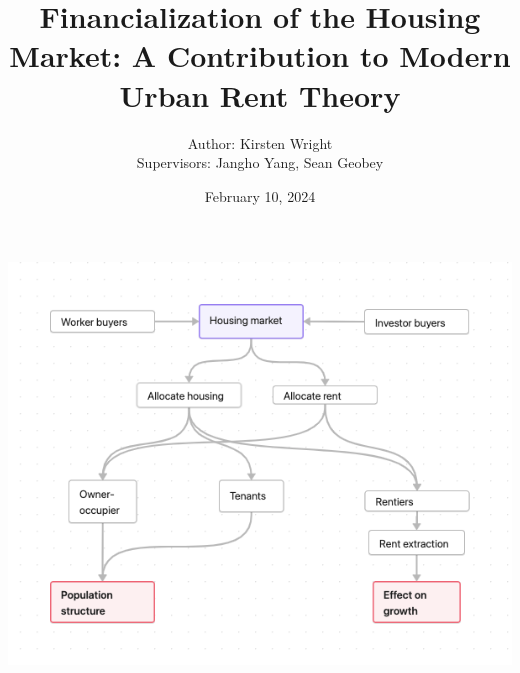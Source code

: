 \documentclass{beamer}
\title{ Financialization of the Housing Market: A Contribution to Modern Urban Rent Theory}
\author{
  Author: Kirsten Wright \\
  Supervisors: Jangho Yang, Sean Geobey
}
\institute{PhD Thesis Defense \\[1ex] University of Waterloo}
\date{February 10, 2024}
\begin{document}

{
    \maketitle   
}

\begin{frame}
\begin{figure}[!ht]
\centering
\resizebox{0.85\textwidth}{!}{}
% 
\label{fig-fields}
\end{figure}
\end{frame}

\begin{frame}%
\begin{center}
    
\includegraphics[scale=.55]{fig/flow-impacts.png}
\end{center}

\end{frame}
\end{document}
